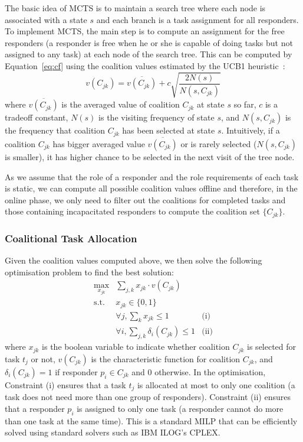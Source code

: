 The basic idea of MCTS is to maintain a search tree where each node
is associated with a state $s$ and each branch is a task assignment
for all responders. To implement MCTS, the main step is to compute
an assignment for the free responders (a responder is free when he
or she is capable of doing tasks but not assigned to any task) at
each node of the search tree. This can be computed by
Equation~\ref{eq:cf} using the coalition values estimated by the
UCB1 heuristic~\cite{auer2002finite}:
\begin{equation}
  v(C_{jk}) = \overline{v(C_{jk})} + c\sqrt{\frac{2N(s)}{N(s, C_{jk})}}
\end{equation}
where $\overline{v(C_{jk})}$ is the averaged value of coalition
$C_{jk}$ at state $s$ so far, $c$ is a tradeoff constant, $N(s)$ is
the visiting frequency of state $s$, and $N(s, C_{jk})$ is the
frequency that coalition $C_{jk}$ has been selected at state $s$.
Intuitively, if a coalition $C_{jk}$ has bigger averaged value
$\overline{v(C_{jk})}$ or is rarely selected ($N(s, C_{jk})$ is
smaller), it has higher chance to be selected in the next visit of
the tree node.

As we assume that the role of a responder and the role requirements
of each task is static, we can compute all possible coalition
values offline and therefore, in the online phase, we only need to
filter out the coalitions for completed tasks and those containing
incapacitated responders to compute the coalition set $\{ C_{jk}
\}$.

\subsubsection{Coalitional Task Allocation}
Given the coalition values computed above, we then solve the following
optimisation problem to find the best solution:
\begin{equation}
  \begin{array}{lll}
    \max\limits_{x_{jk}} & \sum_{j, k} x_{jk} \cdot v(C_{jk}) & \\[2pt]
    \mbox{s.t.} & x_{jk} \in \{0, 1\} & \\[2pt]
    & \forall j, \sum_{k} x_{jk} \leq 1 & \mbox{(i)} \\[2pt]
    & \forall i, \sum_{j, k} \delta_i(C_{jk}) \leq 1 & \mbox{(ii)}
  \end{array}
  \label{eq:cf}
\end{equation}
where $x_{jk}$ is the boolean variable to indicate whether
coalition $C_{jk}$ is selected for task $t_j$ or not, $v(C_{jk})$
is the characteristic function for coalition $C_{jk}$, and
$\delta_i(C_{jk}) = 1$ if responder $p_i\in C_{jk}$ and 0
otherwise. In the optimisation, Constraint (i) ensures that a task
$t_j$ is allocated at most to only one coalition (a task does not
need more than one group of responders). Constraint (ii) ensures
that a responder $p_i$ is assigned to only one task (a responder
cannot do more than one task at the same time). This is a standard
MILP that can be efficiently solved  using standard solvers such as
IBM ILOG's CPLEX.

